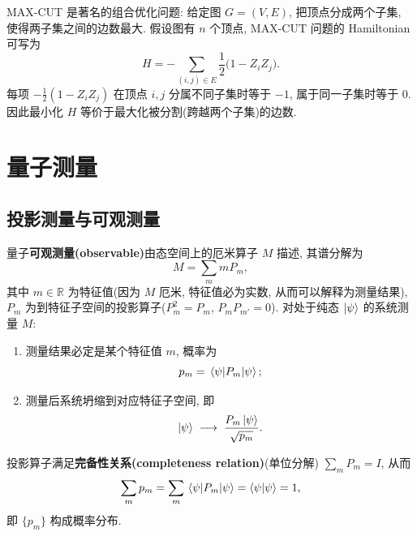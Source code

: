 \documentclass[utf8]{article} %
\numberwithin{equation}{section}   %
\newtheorem{Thm}{\hskip 2em {\color{blue} 定理}}[subsection]
\newtheorem{Eg}{\hskip 2em {\color{black} 例}}[subsection]
\begin{document}
\begin{Eg}
    MAX-CUT 是著名的组合优化问题: 给定图 $G = (V, E)$, 把顶点分成两个子集, 使得两子集之间的边数最大.
    假设图有 $n$ 个顶点, MAX-CUT 问题的 Hamiltonian 可写为
    \begin{equation}
        H = -\sum_{(i,j) \in E} \frac{1}{2}\big(1 - Z_i Z_j\big).
    \end{equation}
    每项 $-\frac{1}{2}(1 - Z_i Z_j)$ 在顶点 $i, j$ 分属不同子集时等于 $-1$, 属于同一子集时等于 $0$.
    因此最小化 $H$ 等价于最大化被分割(跨越两个子集)的边数.
\end{Eg}

\section{量子测量} \label{sec:measurement}

\subsection{投影测量与可观测量}

\begin{Thm}[Born 规则]
    量子\textbf{可观测量(observable)}由态空间上的厄米算子 $M$ 描述, 其谱分解为
    \begin{equation}
        M = \sum_m m P_m,
    \end{equation}
    其中 $m \in \mathbb{R}$ 为特征值(因为 $M$ 厄米, 特征值必为实数, 从而可以解释为测量结果),
    $P_m$ 为到特征子空间的投影算子($P_m^2 = P_m$, $P_m P_{m'} = 0$).
    对处于纯态 $\ket{\psi}$ 的系统测量 $M$:
    \begin{enumerate}
        \item 测量结果必定是某个特征值 $m$, 概率为
        \begin{equation}
            p_m = \mel{\psi}{P_m}{\psi};
        \end{equation}
        \item 测量后系统坍缩到对应特征子空间, 即
        \begin{equation}
            \ket{\psi} \;\longrightarrow\; \frac{P_m \ket{\psi}}{\sqrt{p_m}}.
        \end{equation}
    \end{enumerate}
\end{Thm}

投影算子满足\textbf{完备性关系(completeness relation)}(单位分解) $\sum_m P_m = I$, 从而
\[ \sum_m p_m = \sum_m \mel{\psi}{P_m}{\psi} = \braket{\psi}{\psi} = 1, \]
即 $\{p_m\}$ 构成概率分布.
\end{document}
